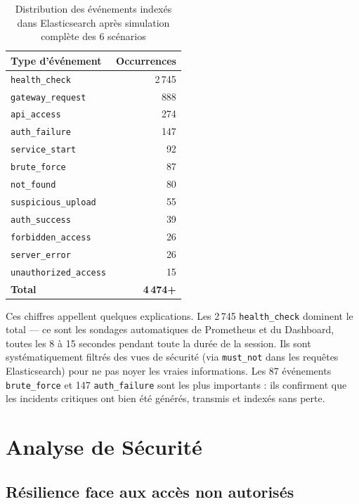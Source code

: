 \documentclass[12pt, a4paper]{report}
\begin{document}
\begin{table}[H]
  \centering
  \caption{Distribution des événements indexés dans Elasticsearch après simulation complète des 6 scénarios}
  \begin{tabular}{@{}lr@{}}
    \toprule
    \textbf{Type d'événement} & \textbf{Occurrences} \\
    \midrule
    \texttt{health\_check}      & 2\,745 \\
    \texttt{gateway\_request}   & 888 \\
    \texttt{api\_access}        & 274 \\
    \texttt{auth\_failure}      & 147 \\
    \texttt{service\_start}     & 92 \\
    \texttt{brute\_force}       & 87 \\
    \texttt{not\_found}         & 80 \\
    \texttt{suspicious\_upload} & 55 \\
    \texttt{auth\_success}      & 39 \\
    \texttt{forbidden\_access}  & 26 \\
    \texttt{server\_error}      & 26 \\
    \texttt{unauthorized\_access} & 15 \\
    \midrule
    \textbf{Total}              & \textbf{4\,474+} \\
    \bottomrule
  \end{tabular}
\end{table}

\medskip
Ces chiffres appellent quelques explications. Les 2\,745 \texttt{health\_check} dominent le total — ce sont les sondages automatiques de Prometheus et du Dashboard, toutes les 8 à 15 secondes pendant toute la durée de la session. Ils sont systématiquement filtrés des vues de sécurité (via \texttt{must\_not} dans les requêtes Elasticsearch) pour ne pas noyer les vraies informations. Les 87 événements \texttt{brute\_force} et 147 \texttt{auth\_failure} sont les plus importants : ils confirment que les incidents critiques ont bien été générés, transmis et indexés sans perte.

\section{Analyse de Sécurité}

\subsection{Résilience face aux accès non autorisés}
\end{document}

